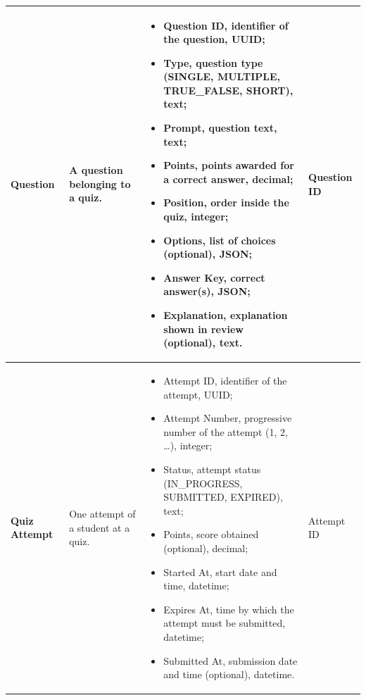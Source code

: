 {\begin{longtable}{|p{}|p{}|p{}|p{}|}
    \textbf{Question} & A question belonging to a quiz. &
    \begin{itemize}[leftmargin=*,nosep,before=\vspace{-\baselineskip}\leavevmode,after=\vspace{-\baselineskip}]
        \item Question ID, identifier of the question, UUID;
        \item Type, question type (SINGLE, MULTIPLE, TRUE\_FALSE, SHORT), text;
        \item Prompt, question text, text;
        \item Points, points awarded for a correct answer, decimal;
        \item Position, order inside the quiz, integer;
        \item Options, list of choices (optional), JSON;
        \item Answer Key, correct answer(s), JSON;
        \item Explanation, explanation shown in review (optional), text.
    \end{itemize}
    & Question ID \\ \hline

    \textbf{Quiz Attempt} & One attempt of a student at a quiz. &
    \begin{itemize}[leftmargin=*,nosep,before=\vspace{-\baselineskip}\leavevmode,after=\vspace{-\baselineskip}]
        \item Attempt ID, identifier of the attempt, UUID;
        \item Attempt Number, progressive number of the attempt (1, 2, \ldots{}), integer;
        \item Status, attempt status (IN\_PROGRESS, SUBMITTED, EXPIRED), text;
        \item Points, score obtained (optional), decimal;
        \item Started At, start date and time, datetime;
        \item Expires At, time by which the attempt must be submitted, datetime;
        \item Submitted At, submission date and time (optional), datetime.
    \end{itemize}
    & Attempt ID \\ \hline


\end{longtable}}

